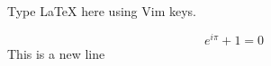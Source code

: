 \documentclass{article}
\begin{document}
Type LaTeX here using Vim keys.

\[
e^{i\pi} + 1 = 0
\]
This is a new line
\end{document}

